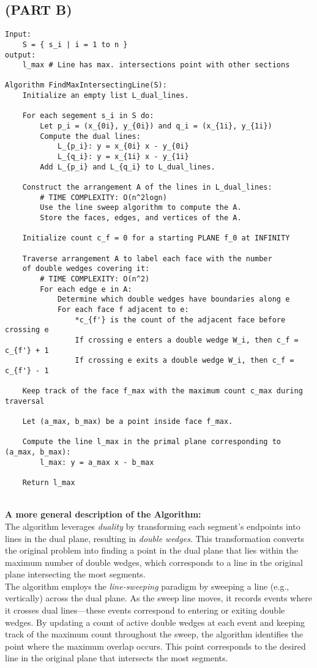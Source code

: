 \documentclass{article}
\begin{document}
\newpage

\subsection*{(PART B)}
\begin{verbatim}
Input:
    S = { s_i | i = 1 to n }
output:
    l_max # Line has max. intersections point with other sections

Algorithm FindMaxIntersectingLine(S): 
    Initialize an empty list L_dual_lines.

    For each segement s_i in S do:
        Let p_i = (x_{0i}, y_{0i}) and q_i = (x_{1i}, y_{1i})
        Compute the dual lines:
            L_{p_i}: y = x_{0i} x - y_{0i}
            L_{q_i}: y = x_{1i} x - y_{1i}
        Add L_{p_i} and L_{q_i} to L_dual_lines.

    Construct the arrangement A of the lines in L_dual_lines:
        # TIME COMPLEXITY: O(n^2logn)
        Use the line sweep algorithm to compute the A.
        Store the faces, edges, and vertices of the A.

    Initialize count c_f = 0 for a starting PLANE f_0 at INFINITY

    Traverse arrangement A to label each face with the number 
    of double wedges covering it: 
        # TIME COMPLEXITY: O(n^2)
        For each edge e in A:
            Determine which double wedges have boundaries along e
            For each face f adjacent to e:
                *c_{f'} is the count of the adjacent face before crossing e
                If crossing e enters a double wedge W_i, then c_f = c_{f'} + 1
                If crossing e exits a double wedge W_i, then c_f = c_{f'} - 1
    
    Keep track of the face f_max with the maximum count c_max during traversal
    
    Let (a_max, b_max) be a point inside face f_max.

    Compute the line l_max in the primal plane corresponding to (a_max, b_max):
        l_max: y = a_max x - b_max

    Return l_max
\end{verbatim}
\\
\textbf{A more general description of the Algorithm: }
\\
The algorithm leverages \textit{duality} by transforming each segment's endpoints into lines in the dual plane, resulting in \textit{double wedges}. This transformation converts the original problem into finding a point in the dual plane that lies within the maximum number of double wedges, which corresponds to a line in the original plane intersecting the most segments.
\\
The algorithm employs the \textit{line-sweeping} paradigm by sweeping a line (e.g., vertically) across the dual plane. As the sweep line moves, it records events where it crosses dual lines---these events correspond to entering or exiting double wedges. By updating a count of active double wedges at each event and keeping track of the maximum count throughout the sweep, the algorithm identifies the point where the maximum overlap occurs. 
This point corresponds to the desired line in the original plane that intersects the most segments.
\end{document}
